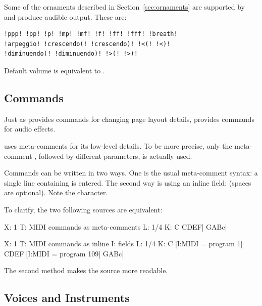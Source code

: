 \documentclass[a4paper,fullpage,12pt]{book}
\begin{document}
Some of the ornaments described in Section~\ref{sec:ornaments} are
supported by \abcMID{} and produce audible output. These are:

\begin{verbatim}
!ppp! !pp! !p! !mp! !mf! !f! !ff! !fff! !breath!
!arpeggio! !crescendo(! !crescendo)! !<(! !<)!
!diminuendo(! !diminuendo)! !>(! !>)!
\end{verbatim}

Default volume is equivalent to . 


\subsection{ Commands}

Just as \abcm{} provides commands for changing page layout details,
\abcmid{} provides commands for audio effects.

\abcmid{} uses meta-comments for its low-level details. To be more
precise, only the meta-comment , followed by different
parameters, is actually used.

Commands can be written in two ways. One is the usual meta-comment
syntax: a single line containing  is entered. The second way is using an inline 
 field: \cmd{[I:MIDI = \parm{command} \parm{parameters}]}
(spaces are optional). Note the \cmd{=} character.


To clarify, the two following sources are equivalent:

\begin{abcsource}
X: 1
T: MIDI commands as meta-comments
L: 1/4
K: C
CDEF|
GABc|
\end{abcsource}

\begin{abcsource}
X: 1
T: MIDI commands as inline I: fields
L: 1/4
K: C
[I:MIDI = program 1] CDEF|[I:MIDI = program 109] GABc|
\end{abcsource}

The second method makes the source more readable.


\subsection{Voices and Instruments}
\end{document}
